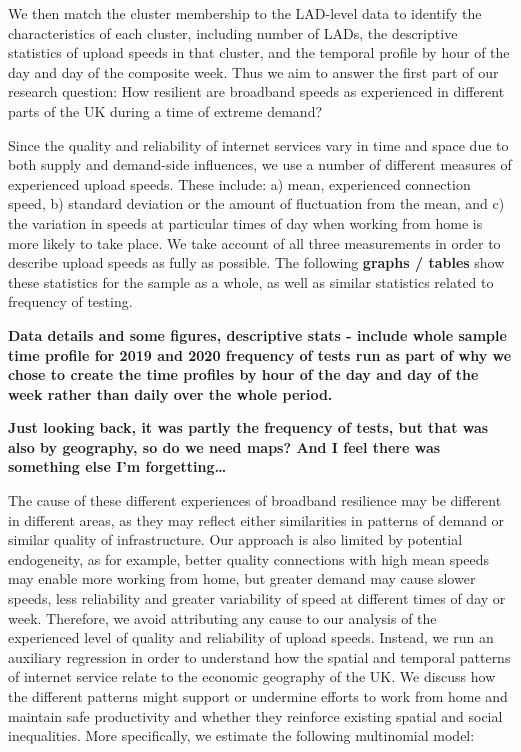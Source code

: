 \documentclass[]{interact}
\theoremstyle{plain}%
\theoremstyle{definition}
\theoremstyle{remark}
\begin{document}
We then match the cluster membership to the LAD-level data to identify
the characteristics of each cluster, including number of LADs, the
descriptive statistics of upload speeds in that cluster, and the
temporal profile by hour of the day and day of the composite week. Thus
we aim to answer the first part of our research question: How resilient
are broadband speeds as experienced in different parts of the UK during
a time of extreme demand?

Since the quality and reliability of internet services vary in time and
space due to both supply and demand-side influences, we use a number of
different measures of experienced upload speeds. These include: a) mean,
experienced connection speed, b) standard deviation or the amount of
fluctuation from the mean, and c) the variation in speeds at particular
times of day when working from home is more likely to take place. We
take account of all three measurements in order to describe upload
speeds as fully as possible. The following \textbf{graphs / tables} show
these statistics for the sample as a whole, as well as similar
statistics related to frequency of testing.

\textbf{Data details and some figures, descriptive stats - include whole
sample time profile for 2019 and 2020 frequency of tests run as part of
why we chose to create the time profiles by hour of the day and day of
the week rather than daily over the whole period.}

\textbf{Just looking back, it was partly the frequency of tests, but
that was also by geography, so do we need maps? And I feel there was
something else I'm forgetting\ldots{}}

The cause of these different experiences of broadband resilience may be
different in different areas, as they may reflect either similarities in
patterns of demand or similar quality of infrastructure. Our approach is
also limited by potential endogeneity, as for example, better quality
connections with high mean speeds may enable more working from home, but
greater demand may cause slower speeds, less reliability and greater
variability of speed at different times of day or week. Therefore, we
avoid attributing any cause to our analysis of the experienced level of
quality and reliability of upload speeds. Instead, we run an auxiliary
regression in order to understand how the spatial and temporal patterns
of internet service relate to the economic geography of the UK. We
discuss how the different patterns might support or undermine efforts to
work from home and maintain safe productivity and whether they reinforce
existing spatial and social inequalities. More specifically, we estimate
the following multinomial model:
\end{document}
